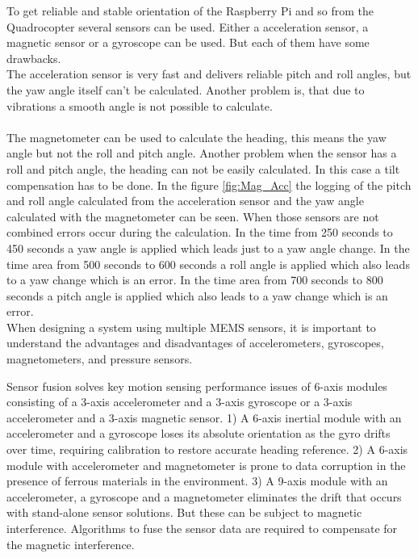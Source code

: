 To get reliable and stable orientation of the Raspberry Pi and so from the Quadrocopter several sensors can be used. Either a acceleration sensor, a magnetic sensor or a gyroscope can be used. But each of them have some drawbacks.\\
The acceleration sensor is very fast and delivers reliable pitch and roll angles, but the yaw angle itself can't be calculated. Another problem is, that due to vibrations a smooth angle is not possible to calculate.\\\\
The magnetometer can be used to calculate the heading, this means the yaw angle but not the roll and pitch angle. Another problem when the sensor has a roll and pitch angle, the heading can not be easily calculated. In this case a tilt compensation has to be done. In the figure \ref{fig:Mag_Acc} the logging of the pitch and roll angle calculated from the acceleration sensor and the yaw angle calculated with the magnetometer can be seen. When those sensors are not combined errors occur during the calculation. In the time from 250 seconds to 450 seconds a yaw angle is applied which leads just to a yaw angle change. In the time area from 500 seconds to 600 seconds a roll angle is applied which also leads to a yaw change which is an error. In the time area from 700 seconds to 800 seconds a pitch angle is applied which also leads to a yaw change which is an error.\\

When designing a system using multiple MEMS sensors, it is important to understand the advantages and disadvantages of accelerometers, gyroscopes, magnetometers, and pressure sensors.

Sensor fusion solves key motion sensing performance issues of 6-axis modules consisting of a 3-axis accelerometer and a 3-axis gyroscope or a 3-axis accelerometer and a 3-axis magnetic sensor. 1) A 6-axis inertial module with an accelerometer and a gyroscope loses its absolute orientation as the gyro drifts over time, requiring calibration to restore accurate heading reference. 2) A 6-axis module with accelerometer and magnetometer is prone to data corruption in the presence of ferrous materials in the environment. 3) A 9-axis module with an accelerometer, a gyroscope and a magnetometer eliminates the drift that occurs with stand-alone sensor solutions. But these can be subject to magnetic interference. Algorithms to fuse the sensor data are required to compensate for the magnetic interference.

